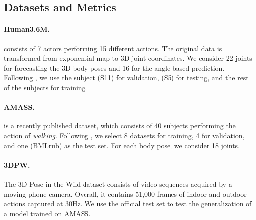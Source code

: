 \documentclass{article}
\begin{document}
\subsection{Datasets and Metrics}
\paragraph{Human3.6M.} \cite{ionescu2013human3} consists of 7 actors performing 15 different actions. The original data is transformed from exponential map to 3D joint coordinates. We consider 22 joints for forecasting the 3D body poses and 16 for the angle-based prediction.  Following \cite{sofianos2021space,mao2020history}, we use the subject (S11) for validation, (S5) for testing, and the rest of the subjects for training.
\paragraph{AMASS.} \cite{mahmood2019amass} is a recently published dataset, which consists of 40 subjects performing the action of \textit{walking}. Following \cite{sofianos2021space,mao2021multi}, we select 8 datasets for training, 4 for validation, and one (BMLrub) as the test set. For each body pose, we consider 18 joints.
\paragraph{3DPW.} The 3D Pose in the Wild dataset \cite{von2018recovering} consists of video sequences acquired by a moving phone camera. Overall, it contains 51,000 frames of indoor and outdoor actions captured at 30Hz. We use the official test set to test the generalization of a model trained on AMASS. 
\end{document}
